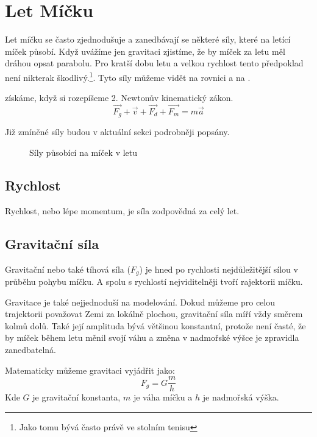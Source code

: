 \section{Let Míčku}
\label{ssec:let-micku}
Let míčku se často zjednodušuje a zanedbávají se některé síly, které na letící
míček působí. Když uvážíme jen gravitaci zjistíme, že by míček za letu měl
dráhou opsat parabolu. Pro kratší dobu letu a velkou rychlost tento předpoklad
není nikterak škodlivý.\footnote{Jako tomu bývá často právě ve stolním tenisu}.
Tyto síly můžeme vidět na rovnici  a na
.

 získáme, když si rozepíšeme 2. Newtonův kinematický
zákon. 
\begin{equation}
 \label{eq:Newton}
  \vec{F_g} + \vec{v} + \vec{F_d} + \vec{F_m} = m \vec{a}
\end{equation}

Již zmíněné síly budou v aktuální sekci podrobněji popsány.

\begin{figure}[htbp]
 \centering
 

 \caption{Síly působící na míček v letu}
 \label{fig:let-micku}
\end{figure}


\subsection{Rychlost}
\label{ssec:rychlost}
Rychlost, nebo lépe momentum, je síla zodpovědná za celý let. 


\subsection{Gravitační síla}
\label{ssec:gravitacni-sila}

Gravitační nebo také tíhová síla ($F_g$) je hned po rychlosti nejdůležitější sílou v
průběhu pohybu míčku. A spolu s rychlostí nejviditelněji tvoří rajektorii míčku.

Gravitace je také nejjednoduší na modelování. Dokud můžeme pro celou trajektorii
považovat Zemi za lokálně plochou, gravitační síla míří vždy směrem kolmů dolů.
Také její amplituda bývá většinou konstantní, protože není časté, že by míček
během letu měnil svojí váhu a změna v nadmořské výšce je zpravidla zanedbatelná.

Matematicky můžeme gravitaci vyjádřit jako:
\[
 F_g = G\frac{m}{h}
\]
Kde $G$ je gravitační konstanta, $m$ je váha míčku a $h$ je nadmořská výška.

